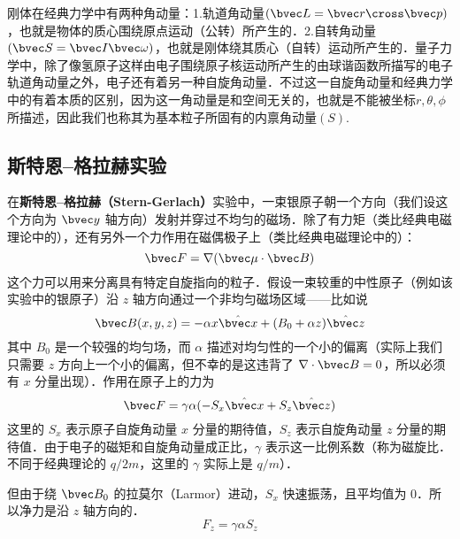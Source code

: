 
\begin{issues}
\issueDraft
\end{issues}


刚体在经典力学中有两种角动量：1.轨道角动量$(\bvec L = \bvec r\cross\bvec p)$，也就是物体的质心围绕原点运动（公转）所产生的．2.自转角动量$(\bvec S = \bvec I\bvec\omega)$，也就是刚体绕其质心（自转）运动所产生的．量子力学中，除了像氢原子这样由电子围绕原子核运动所产生的由球谐函数所描写的电子轨道角动量之外，电子还有着另一种自旋角动量．不过这一自旋角动量和经典力学中的有着本质的区别，因为这一角动量是和空间无关的，也就是不能被坐标$r,\theta,\phi$所描述，因此我们也称其为基本粒子所固有的内禀角动量$(S)$.
\subsection{斯特恩–格拉赫实验}

在\textbf{斯特恩–格拉赫（Stern-Gerlach）}实验中，一束银原子朝一个方向（我们设这个方向为 $\bvec y$ 轴方向）发射并穿过不均匀的磁场．除了有力矩（类比经典电磁理论中的），还有另外一个力作用在磁偶极子上（类比经典电磁理论中的）：
\begin{equation}\label{Spin_eq1}
\bvec F=\nabla(\bvec \mu\cdot \bvec B)
\end{equation}
这个力可以用来分离具有特定自旋指向的粒子．假设一束较重的中性原子（例如该实验中的银原子）沿 $z$ 轴方向通过一个非均匀磁场区域——比如说
\begin{equation}\label{Spin_eq2}
\bvec B(x,y,z)=-\alpha x \hat{\bvec x}+(B_0+\alpha z)\hat {\bvec z}
\end{equation}
其中 $B_0$ 是一个较强的均匀场，而 $\alpha$ 描述对均匀性的一个小的偏离（实际上我们只需要 $z$ 方向上一个小的偏离，但不幸的是这违背了 $\nabla\cdot \bvec B=0$，所以必须有 $x$ 分量出现）．作用在原子上的力为
\begin{equation}
\bvec F=\gamma \alpha (-S_x \hat{\bvec x}+S_z\hat{\bvec z})
\end{equation}
这里的 $S_x$ 表示原子自旋角动量 $x$ 分量的期待值，$S_z$ 表示自旋角动量 $z$ 分量的期待值．由于电子的磁矩和自旋角动量成正比，$\gamma$ 表示这一比例系数（称为磁旋比．不同于经典理论的 $q/2m$，这里的 $\gamma$ 实际上是 $q/m$）．

但由于绕 $\bvec B_0$ 的拉莫尔（Larmor）进动，$S_x$ 快速振荡，且平均值为 $0$．所以净力是沿 $z$ 轴方向的．
\begin{equation}
F_z=\gamma\alpha S_z
\end{equation}

